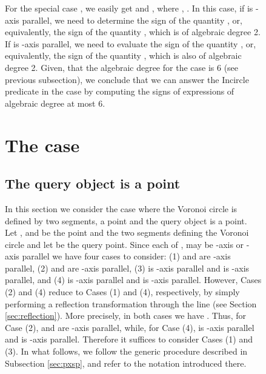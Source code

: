 \documentclass[letterpaper,11pt]{article}
\newcommand{\incircle}{\textsf{Incircle}\xspace}
\newcommand{\vor}{Voronoi\xspace}
\newcommand{\pss}{\xspace}
\newcommand{\ppsp}{\xspace}
\newcommand{\ppss}{\xspace}
\begin{document}
{\begin{figure}[!b]
\begin{comment}
\begin{table}[t]
\begin{center}
\begin{tabular}{|c|c|}
\hline
Relative positions of ,  & Root of  of interest\\
\hline \hline
 &  \\ \hline 
 &  \\ \hline 
\end{tabular}
\end{center}
\caption{The possible relative positions of ,  and the
  corresponding root of  of interest (assuming
  ).}\label{Table:yPPS}
\end{table}
\end{comment}

For the special case , we easily get
 and , where
,
.
In this case, if  is -axis parallel, we need to determine the
sign of the quantity
, or, equivalently, the sign
of the quantity , which is of algebraic
degree 2. If  is -axis parallel, we need to evaluate the sign
of the quantity , or,
equivalently, the sign of the quantity
, which is also of algebraic degree
2. Given, that the algebraic degree for the \ppsp case
is 6 (see previous subsection), 
we conclude that we can answer the \incircle predicate in the \ppss
case by computing the signs of expressions of algebraic degree at most
6.





\section{The \pss case}\label{sec:pss}

\subsection{The query object is a point}\label{sec:pssp}

In this section we consider the case where the \vor circle is defined
by two segments, a point and the query object is a point. Let ,
 and  be the point and the two segments defining the \vor
circle and let  be the query point. Since each of ,  may be
-axis or -axis parallel we have four cases to consider:
(1)  and  are -axis parallel,
(2)  and  are -axis parallel,
(3)  is -axis parallel and  is -axis parallel, and
(4)  is -axis parallel and  is -axis parallel.
However, Cases (2) and (4) reduce to Cases (1) and (4), respectively,
by simply performing a reflection transformation through the line
 (see Section \ref{sec:reflection}). More precisely, in both
cases we have
. Thus,
for Case (2),  and  are -axis parallel, while,
for Case (4),  is -axis parallel and  is
-axis parallel. Therefore it suffices to consider Cases (1) and (3).
In what follows, we follow the generic procedure described in
Subsection \ref{sec:pxsp}, and refer to the notation introduced
there.


\end{figure}}
\end{document}
